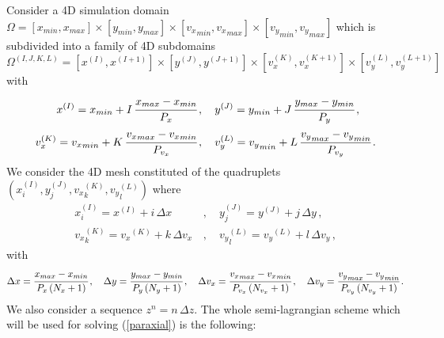 \documentclass[10pt]{article}
\begin{document}
Consider a 4D simulation domain $\Omega = [x_{min},x_{max}] \times [y_{min},y_{max}] \times [{v_{x}}_{min},{v_{x}}_{max}] \times [{v_{y}}_{min},{v_{y}}_{max}]$ which is subdivided into a family of 4D subdomains $\Omega^{(I,J,K,L)} = [x^{(I)},x^{(I+1)}] \times [y^{(J)},y^{(J+1)}] \times [v_{x}^{(K)},v_{x}^{(K+1)}] \times [v_{y}^{(L)},v_{y}^{(L+1)}]$ with
\begin{equation}
\begin{split}
x^{(I)} = x_{min} + I\,\cfrac{x_{max}-x_{min}}{P_{x}} \, &, \quad y^{(J)} = y_{min} + J\,\cfrac{y_{max}-y_{min}}{P_{y}} \, , \\
v_{x}^{(K)} = {v_{x}}_{min} + K\,\cfrac{{v_{x}}_{max}-{v_{x}}_{min}}{P_{v_{x}}} \, &, \quad v_{y}^{(L)} = {v_{y}}_{min} + L\,\cfrac{{v_{y}}_{max}-{v_{y}}_{min}}{P_{v_{y}}} \, .
\end{split}
\end{equation}
We consider the 4D mesh constituted of the quadruplets $(x_{i}^{(I)},y_{j}^{(J)},{v_{x}}_{k}^{(K)},{v_{y}}_{l}^{(L)})$ where
\begin{equation}
\begin{split}
x_{i}^{(I)} = x^{(I)} + i\,\Delta x \, &, \quad y_{j}^{(J)} = y^{(J)} + j\,\Delta y \, , \\
{v_{x}}_{k}^{(K)} = {v_{x}}^{(K)} + k\,\Delta v_{x} \, &, \quad {v_{y}}_{l}^{(L)} = {v_{y}}^{(L)} + l\,\Delta v_{y} \, ,
\end{split}
\end{equation}
with
\begin{equation}
\Delta x = \cfrac{x_{max}-x_{min}}{P_{x}\,(N_{x}+1)}\, , \quad \Delta y = \cfrac{y_{max}-y_{min}}{P_{y}\,(N_{y}+1)} \, , \quad \Delta v_{x} = \cfrac{{v_{x}}_{max}-{v_{x}}_{min}}{P_{v_{x}}\,(N_{v_{x}}+1)} \, , \quad \Delta v_{y} = \cfrac{{v_{y}}_{max}-{v_{y}}_{min}}{P_{v_{y}}\,(N_{v_{y}}+1)} \, .
\end{equation}
We also consider a sequence $z^{n} = n\,\Delta z$. The whole semi-lagrangian scheme which will be used for solving (\ref{paraxial}) is the following:
\end{document}
